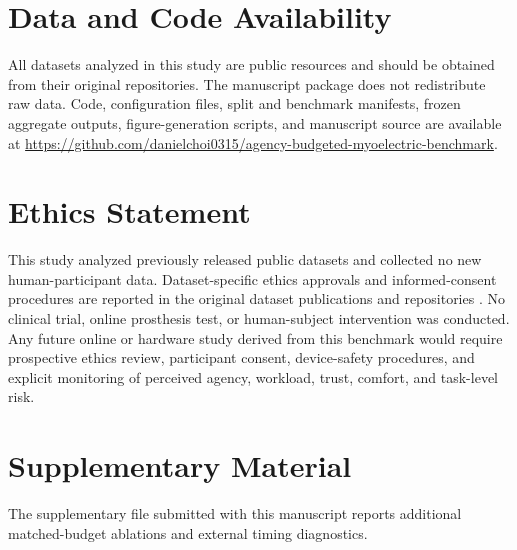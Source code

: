 \documentclass[journal]{IEEEtran}
\begin{document}
\section*{Data and Code Availability}
All datasets analyzed in this study are public resources and should be obtained from their original repositories. The manuscript package does not redistribute raw data. Code, configuration files, split and benchmark manifests, frozen aggregate outputs, figure-generation scripts, and manuscript source are available at \url{https://github.com/danielchoi0315/agency-budgeted-myoelectric-benchmark}.

\section*{Ethics Statement}
This study analyzed previously released public datasets and collected no new human-participant data. Dataset-specific ethics approvals and informed-consent procedures are reported in the original dataset publications and repositories \cite{Cognolato2020MeganePro,Jiang2021Hyser,Jiang2023HyserPhysioNet,Yang2025CEMHSEY,Pradhan2022GRABMyo,Jiang2024GRABMyoPhysioNet}. No clinical trial, online prosthesis test, or human-subject intervention was conducted. Any future online or hardware study derived from this benchmark would require prospective ethics review, participant consent, device-safety procedures, and explicit monitoring of perceived agency, workload, trust, comfort, and task-level risk.

\section*{Supplementary Material}
The supplementary file submitted with this manuscript reports additional matched-budget ablations and external timing diagnostics.

\balance


\end{document}
